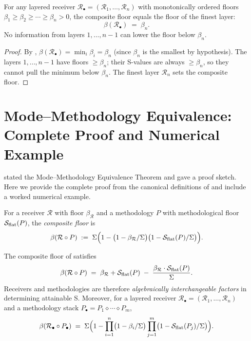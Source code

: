 \begin{theorem}
\label{thm:floor-propagation}
For any layered receiver $\mathcal{R}_\bullet = (\mathcal{R}_1, \ldots,
\mathcal{R}_n)$ with monotonically ordered floors $\beta_1 \geq \beta_2
\geq \cdots \geq \beta_n > 0$, the composite floor equals the floor of the
finest layer:
\[
  \beta(\mathcal{R}_\bullet) \;=\; \beta_n .
\]
No information from layers $1, \ldots, n-1$ can lower the floor below $\beta_n$.
\end{theorem}

\begin{proof}
By , $\beta(\mathcal{R}_\bullet) = \min_i
\beta_i = \beta_n$ (since $\beta_n$ is the smallest by hypothesis).  The
layers $1, \ldots, n-1$ have floors $\geq \beta_n$; their S-values are always
$\geq \beta_n$, so they cannot pull the minimum below $\beta_n$.  The finest
layer $\mathcal{R}_n$ sets the composite floor.
\end{proof}

\section{Mode--Methodology Equivalence: Complete Proof and Numerical Example}
\label{sec:mode-method-ch02}

 stated the Mode--Methodology Equivalence Theorem
and gave a proof sketch.  Here we provide the complete proof from the canonical
definitions of  and include a worked numerical
example.

\begin{definition}
\label{def:rm-comp}
For a receiver $\mathcal{R}$ with floor $\beta_\mathcal{R}$ and a methodology
$P$ with methodological floor $\mathcal{S}_{\mathrm{flat}}(P)$, the
\emph{composite floor} is
\[
  \beta(\mathcal{R} \circ P)
  \;:=\; \Sigma \Bigl(1 - \bigl(1 - \beta_\mathcal{R}/\Sigma\bigr)
  \bigl(1 - \mathcal{S}_{\mathrm{flat}}(P)/\Sigma\bigr)\Bigr) .
\]
\end{definition}

\begin{theorem}
\label{thm:mode-method-complete}
The composite floor of  satisfies
\[
  \beta(\mathcal{R} \circ P)
  \;=\; \beta_\mathcal{R} + \mathcal{S}_{\mathrm{flat}}(P)
  \;-\; \frac{\beta_\mathcal{R} \cdot \mathcal{S}_{\mathrm{flat}}(P)}{\Sigma} .
\]
Receivers and methodologies are therefore \emph{algebraically interchangeable
factors} in determining attainable S.  Moreover, for a layered receiver
$\mathcal{R}_\bullet = (\mathcal{R}_1, \ldots, \mathcal{R}_n)$ and a
methodology stack $P_\bullet = P_1 \diamond \cdots \diamond P_m$,
\[
  \beta(\mathcal{R}_\bullet \circ P_\bullet)
  \;=\; \Sigma \Bigl(1 - \prod_{i=1}^n \bigl(1 - \beta_i/\Sigma\bigr)
  \prod_{j=1}^m \bigl(1 - \mathcal{S}_{\mathrm{flat}}(P_j)/\Sigma\bigr)\Bigr) .
\]
\end{theorem}

